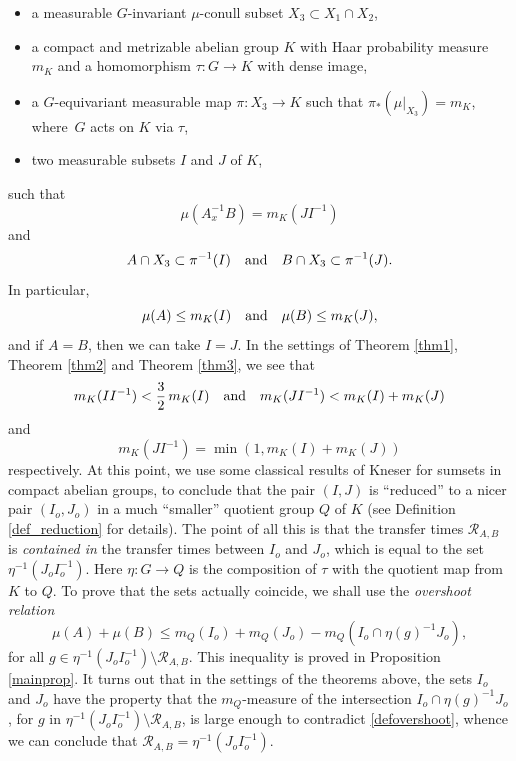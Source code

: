 \documentclass[10pt]{amsart}
\let\mathcal\mathscr
\newcommand{\cR}{\mathcal{R}}
\newcommand{\qand}{\quad\textup{and}\quad}
\theoremstyle{plain}
\theoremstyle{definition}
\begin{document}
\begin{itemize}
\item a measurable $G$-invariant $\mu$-conull subset $X_3 \subset X_1 \cap X_2$,

\item a compact and metrizable abelian group $K$ with Haar probability measure $m_K$ and
a homomorphism $\tau : G \to K$ with dense image,

\item a $G$-equivariant measurable map $\pi : X_3 \to K$ such that $\pi_*(\mu |_{X_3}) = m_K$, where~$G$ acts on $K$ via $\tau$,

\item two measurable subsets $I$ and $J$ of $K$,
\end{itemize}
such that
\[
\mu(A_x^{-1}B) = m_K(JI^{-1})
\]
and
\[
A \cap X_3 \subset \pi^{-1}(I) \qand B \cap X_3 \subset \pi^{-1}(J).
\]
In particular,
\[
\mu(A) \leq m_K(I) \qand \mu(B) \leq m_K(J),
\]
and if $A = B$, then we can take $I = J$. In the settings of Theorem \ref{thm1}, Theorem \ref{thm2} and Theorem \ref{thm3}, we see that
\[
m_K(I I^{-1}) < \frac{3}{2}\, m_K(I)
\qand
m_K(JI^{-1}) < m_K(I) + m_K(J)
\]
and
\[
m_K(J I^{-1}) = \min(1,m_K(I) + m_K(J))
\]
respectively. At this point, we use some classical results \cite{Kneser} of Kneser for sumsets in compact abelian groups,
to conclude that the pair $(I,J)$ is ``reduced'' to a nicer pair $(I_o,J_o)$ in a much ``smaller'' quotient group $Q$ of $K$ (see
Definition \ref{def_reduction} for details). The point of all this is that the transfer times $\cR_{A,B}$ is \emph{contained in} the
transfer times between $I_o$ and $J_o$, which is equal to the set $\eta^{-1}(J_oI_o^{-1})$. Here $\eta : G \to Q$ is the composition
of $\tau$ with the quotient map from $K$ to $Q$. To prove that the sets actually coincide,
we shall use the \emph{overshoot relation}
\begin{equation}
\label{defovershoot}
\mu(A) + \mu(B) \leq m_Q(I_o) + m_Q(J_o) - m_Q(I_o \cap \eta(g)^{-1}J_o),
\end{equation}
for all $g \in \eta^{-1}(J_o I_o^{-1}) \setminus \cR_{A,B}$. This inequality is proved in Proposition \ref{mainprop}. It turns out that in
the settings of the theorems above, the sets $I_o$ and $J_o$ have the property that the $m_Q$-measure of the
intersection $I_o \cap \eta(g)^{-1}J_o$, for $g$ in $\eta^{-1}(J_o I_o^{-1}) \setminus \cR_{A,B}$, is large enough to
contradict \eqref{defovershoot}, whence we can conclude that $\cR_{A,B} = \eta^{-1}(J_o I_o^{-1})$.
\end{document}
